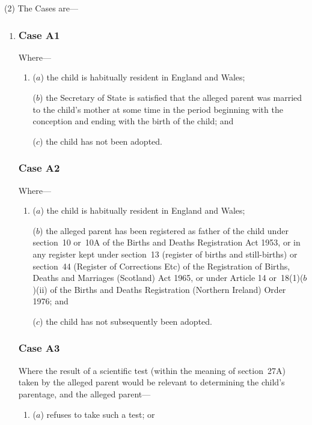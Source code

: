 \documentclass[12pt,a4paper]{article}
\begin{document}
(2) The Cases are—
\begin{enumerate}\item[]
\subsubsection*{Case A1}

Where—
\begin{enumerate}\item[]
($a$) the child is habitually resident in England and Wales;

($b$) the Secretary of State is satisfied that the alleged parent was married to the child’s mother at some time in the period beginning with the conception and ending with the birth of the child; and

($c$) the child has not been adopted.
\end{enumerate}

\subsubsection*{Case A2}

Where—
\begin{enumerate}\item[]
($a$) the child is habitually resident in England and Wales;

($b$) the alleged parent has been registered as father of the child under section~10 or~10A of the Births and Deaths Registration Act 1953, or in any register kept under section~13 (register of births and still-births) or section~44 (Register of Corrections Etc) of the Registration of Births, Deaths and Marriages (Scotland) Act 1965, or under Article 14 or~18(1)($b$)(ii)  of the Births and Deaths Registration (Northern Ireland) Order 1976; and

($c$) the child has not subsequently been adopted.
\end{enumerate}

\subsubsection*{Case A3}

Where the result of a scientific test (within the meaning of section~27A) taken by the alleged parent would be relevant to determining the child’s parentage, and the alleged parent—
\begin{enumerate}\item[]
($a$) refuses to take such a test; or


\end{enumerate}
\end{enumerate}
\end{document}
